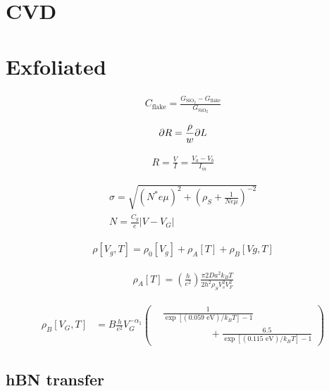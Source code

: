 \documentclass[../Matt_Gebert_Honours_Thesis.tex]{subfiles}
\begin{document}

\section{CVD}

\section{Exfoliated}

\begin{align}
	C_{\text{flake}} = \frac{G_{\text{SiO}_2}-G_{\text{flake}}}{G_{\text{SiO}_2}}
\end{align}

\begin{align}
	\partial R = \frac{\rho}{w} \partial L
\end{align}

\begin{align}
	R = \frac{V}{I} = \frac{V_a-V_b}{I_{in}}
\end{align}

\begin{align}
	\sigma = \sqrt{\left(N^* e \mu\right)^2 + \left(\rho_S + \frac{1}{N e \mu}\right)^{-2}}\\
	N = \frac{C_g}{e} \left|V-V_G\right|
\end{align}

\begin{align}
	\rho[V_g,T] = \rho_0[V_g] + \rho_A[T] + \rho_B[Vg,T]
\end{align}

\begin{align}
	\rho_A[T] = \left(\frac{h}{e^2}\right) \frac{\pi2 Da^2 k_B T}{2 h^2 \rho_S V_s^2 V_F^2}
\end{align}

\begin{align}
\rho_B[V_G,T]&= B \frac{h}{e^2} V_G^{-\alpha_1} \left(\begin{aligned}
&\frac{1}{\exp\left[(0.059\text{ eV})/k_B T\right]-1}\\ &\hspace{2cm}+\frac{6.5}{\exp\left[(0.115\text{ eV})/k_B T\right]-1}
\end{aligned}\right)
\end{align}

\subsection{hBN transfer}
\end{document}
